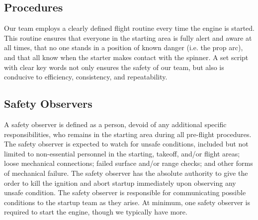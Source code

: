 \documentclass[10pt]{report}
\begin{document}
\subsection{Procedures}
Our team employs a clearly defined flight routine every time the engine is started.  This routine ensures that everyone in the starting area is fully alert and aware at all times, that no one stands in a position of known danger (i.e. the prop arc), and that all know when the starter makes contact with the spinner.  A set script with clear key words not only ensures the safety of our team, but also is conducive to efficiency, consistency, and repeatability.

\subsection{Safety Observers}
A safety observer is defined as a person, devoid of any additional specific responsibilities, who remains in the starting area during all pre-flight procedures.  The safety observer is expected to watch for unsafe conditions, included but not limited to non-essential personnel in the starting, takeoff, and/or flight areas; loose mechanical connections; failed surface and/or range checks; and other forms of mechanical failure.  The safety observer has the absolute authority to give the order to kill the ignition and abort startup immediately upon observing any unsafe condition.  The safety observer is responsible for communicating possible conditions to the startup team as they arise. At minimum, one safety observer is required to start the engine, though we typically have more.

\newpage
\appendix
\renewcommand\thesection{Appendix \Alph{section}:}
\end{document}
